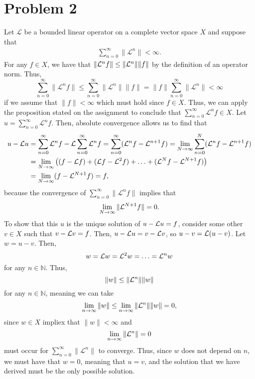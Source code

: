 \documentclass{article}
\begin{document}
\section{Problem 2}
Let $\mathcal L$ be a bounded linear operator on a complete vector space $X$ and suppose that
  \begin{align*}
    \sum_{n=0}^\infty \| \mathcal L^n \| < \infty.
  \end{align*}
For any $f\in X$, we have that $\|{\cal L}^nf\|\leq\|{\cal L}^n\|\|f\|$ by the definition of an operator norm. Thus,
\[
\sum_{n=0}^\infty \| \mathcal L^n f\|\leq\sum_{n=0}^\infty \| \mathcal L^n\| \|f\|=\|f\|\sum_{n=0}^\infty \| \mathcal L^n\|<\infty
\]
if we assume that $\|f\|<\infty$ which must hold since $f\in X$. Thus, we can apply the proposition stated on the assignment to conclude that $\sum_{n=0}^\infty \mathcal L^n f\in X$. Let $u=\sum_{n=0}^\infty \mathcal L^n f$. Then, absolute convergence allows us to find that
\begin{align*}
u-{\cal L} u&=\sum_{n=0}^\infty \mathcal L^n f-{\cal L}\sum_{n=0}^\infty \mathcal L^n f=\sum_{n=0}^\infty({\cal L}^nf-{\cal L}^{n+1}f)=\lim_{N\to\infty}\sum_{n=0}^N({\cal L}^nf-{\cal L}^{n+1}f)\\&=
\lim_{N\to\infty}\left((f-{\cal L} f)+({\cal L} f-{\cal L}^2f)+\ldots+({\cal L}^Nf-{\cal L}^{N+1}f)\right)\\&=
\lim_{N\to\infty}(f-{\cal L}^{N+1}f)=f,
\end{align*}
because the convergence of $\sum_{n=0}^\infty \| \mathcal L^n f\|$ implies that 
\[
\lim_{N\to\infty}\|{\cal L}^{N+1}f\|=0.
\]
To show that this $u$ is the unique solution of $u-{\cal L} u=f$, consider some other $v\in X$ such that $v-{\cal L} v=f$. Then, $u-{\cal L} u=v-{\cal L} v$, so $u-v={\cal L}(u-v)$. Let $w=u-v$. Then,
\[
w={\cal L} w={\cal L}^2 w=\ldots={\cal L}^n w
\]
for any $n\in \mathbb{N}$. Thus, 
\[
\|w\|\leq\|{\cal L}^n\| \|w\|
\]
for any $n\in \mathbb{N}$, meaning we can take 
\[
\lim_{n\to\infty}\|w\|\leq\lim_{n\to\infty}\|{\cal L}^n\| \|w\|=0,
\]
since $w\in X$ impliex that $\|w\|<\infty$ and 
\[
\lim_{n\to\infty}\|{\cal L}^n\|=0
\]
must occur for $\sum_{n=0}^\infty \| \mathcal L^n \|$ to converge. Thus, since $w$ does not depend on $n$, we must have that $w=0$, meaning that $u=v$, and the solution that we have derived must be the only possible solution.
\end{document}
